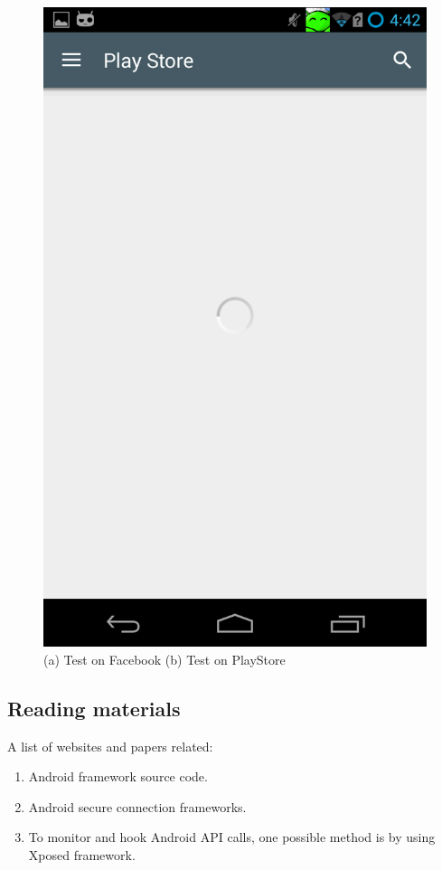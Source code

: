 \documentclass[a4paper, 12pt]{article}
\begin{document}
\begin{figure}[!hbt]
\includegraphics[scale=.3]{imgs/impl/testPlayStore}\\
\scriptsize (a) Test on Facebook \hspace{8em} (b) Test on PlayStore
\end{figure}
\subsection{Reading materials}
A list of websites and papers related:
\begin{enumerate} 
\item Android framework source code. \cite{link_aosp}
\item Android secure connection frameworks. \cite{link_android_ssl}
\item To monitor and hook Android API calls, one possible method is by using Xposed \cite{link_xposed} framework.
\end{enumerate}
\end{document}
